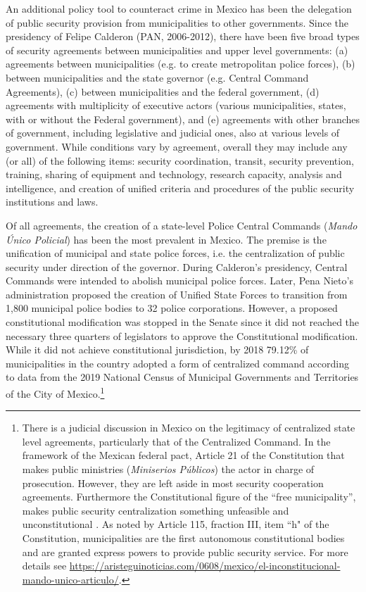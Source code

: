 \documentclass[12pt]{amsart}
\numberwithin{equation}{section}
\theoremstyle{definition}
\theoremstyle{definition}
\theoremstyle{definition}
\begin{document}
An additional policy tool to counteract crime in Mexico has been the delegation of public security provision from municipalities to other governments. Since the presidency of Felipe Calderon (PAN, 2006-2012), there have been five broad types of security agreements between municipalities and upper level governments: (a) agreements between municipalities (e.g. to create metropolitan police forces), (b) between municipalities and the state governor (e.g. Central Command Agreements), (c) between municipalities and the federal government, (d) agreements with multiplicity of executive actors (various municipalities, states, with or without the Federal government), and (e) agreements with other branches of government, including legislative and judicial ones, also at various levels of government. While conditions vary by agreement, overall they may include any (or all) of the following items: security coordination, transit, security prevention, training, sharing of equipment and technology, research capacity, analysis and intelligence, and creation of unified criteria and procedures of the public security institutions and laws.

Of all agreements, the creation of a state-level Police Central Commands (\emph{Mando \'Unico Policial}) has been the most prevalent in Mexico. The premise is the unification of municipal and state police forces, i.e. the centralization of public security under direction of the governor. During Calderon's presidency, Central Commands were intended to abolish municipal police forces. Later, Pena Nieto's administration proposed the creation of Unified State Forces to transition from 1,800 municipal police bodies to 32 police corporations. However, a proposed constitutional modification was stopped in the Senate since it did not reached the necessary three quarters of legislators to approve the Constitutional modification. While it did not achieve constitutional jurisdiction, by 2018 79.12\% of municipalities in the country adopted a form of centralized command according to data from the 2019 National Census of Municipal Governments and Territories of the City of Mexico.\footnote{There is a judicial discussion in Mexico on the legitimacy of centralized state level agreements, particularly that of the Centralized Command. In the framework of the Mexican federal pact, Article 21 of the Constitution that makes public ministries (\emph{Miniserios P\'ublicos}) the actor in charge of prosecution. However, they are  left aside in most security cooperation agreements. Furthermore the Constitutional figure of the ``free municipality'', makes public security centralization something unfeasible and unconstitutional \citep{moloeznik_2016}. As noted by Article 115, fraction III, item ``h" of the Constitution, municipalities are the first autonomous constitutional bodies and are granted express powers to provide public security service. For more details see \url{https://aristeguinoticias.com/0608/mexico/el-inconstitucional-mando-unico-articulo/}.}  
\end{document}
